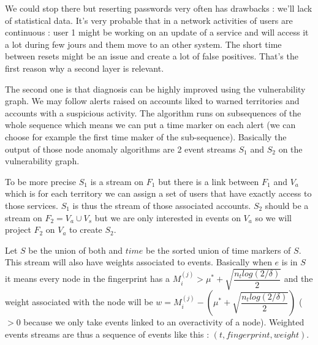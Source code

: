 \documentclass[11pt]{article}
\begin{document}
We could stop there but reserting passwords very often has drawbacks : we'll lack of statistical data. It's very probable that in a network activities of users are continuous : user 1 might be working on an update of a service and will access it a lot during few jours and them move to an other system. The short time between resets might be an issue and create a lot of false positives. That's the first reason why a second layer is relevant.

The second one is that diagnosis can be highly improved using the vulnerability graph. We may follow alerts raised on accounts liked to warned territories and accounts with a suspicious activity. The algorithm runs on subsequences of the whole sequence which means we can put a time marker on each alert (we can choose for example the first time maker of the sub-sequence). Basically the output of those node anomaly algorithms are 2 event streams $S_1$ and $S_2$ on the vulnerability graph. 

To be more precise $S_1$ is a stream on $F_1$ but there is a link between $F_1$ and $V_a$ which is for each territory we can assign a set of users that have exactly access to those services. $S_1$ is thus the stream of those associated accounts. $S_2$ should be a stream on $F_2=V_a\cup V_s$ but we are only interested in events on $V_a$ so we will project $F_2$ on $V_a$ to create $S_2$. 

Let $S$ be the union of both and $time$ be the sorted union of time markers of $S$. This stream will also have weights associated to events. Basically when $e$ is in $S$ it means every node in the fingerprint has a $M_i^{(j)} > \mu^*+\sqrt{\dfrac{n_tlog(2/\delta)}{2}}$ and the weight associated with the node will be $w = M_i^{(j)} - (\mu^*+\sqrt{\dfrac{n_tlog(2/\delta)}{2}})$ ($>0$ because we only take events linked to an overactivity of a node). Weighted events streams are thus a sequence of events like this : $(t,fingerprint,weight)$.
\end{document}
